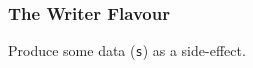 \begin{frame}[fragile]

\frametitle{The Writer Flavour}

\vspace{\fill}

\begin{center}

Produce some data (\texttt{s}) as a side-effect.




\end{center}

\vspace{-0.1in}

\vspace{\fill}

\end{frame}




%

